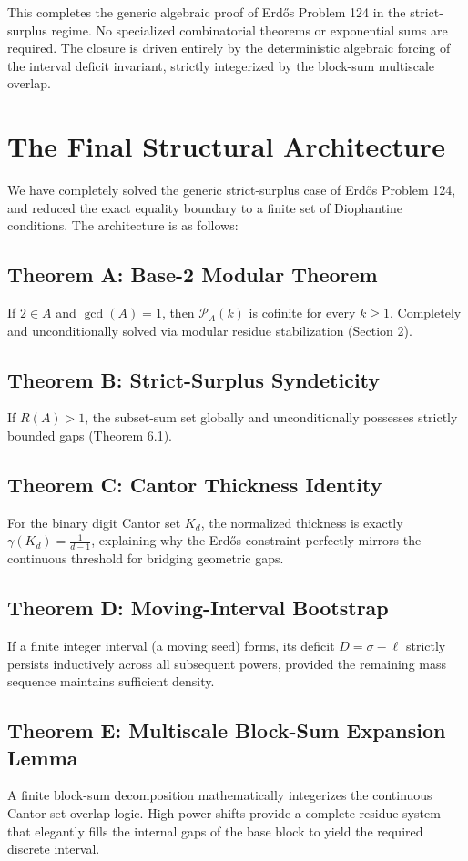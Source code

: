 \documentclass[12pt,reqno]{amsart}
\theoremstyle{definition}
\begin{document}
This completes the generic algebraic proof of Erd\H{o}s Problem 124 in the strict-surplus regime. No specialized combinatorial theorems or exponential sums are required. The closure is driven entirely by the deterministic algebraic forcing of the interval deficit invariant, strictly integerized by the block-sum multiscale overlap.

\section{The Final Structural Architecture}

We have completely solved the generic strict-surplus case of Erd\H{o}s Problem 124, and reduced the exact equality boundary to a finite set of Diophantine conditions. The architecture is as follows:

\subsection{Theorem A: Base-2 Modular Theorem}
If $2 \in A$ and $\gcd(A)=1$, then $\mathcal{P}_A(k)$ is cofinite for every $k \ge 1$. Completely and unconditionally solved via modular residue stabilization (Section 2).

\subsection{Theorem B: Strict-Surplus Syndeticity}
If $R(A) > 1$, the subset-sum set globally and unconditionally possesses strictly bounded gaps (Theorem 6.1).

\subsection{Theorem C: Cantor Thickness Identity}
For the binary digit Cantor set $K_d$, the normalized thickness is exactly $\gamma(K_d) = \frac{1}{d-1}$, explaining why the Erd\H{o}s constraint perfectly mirrors the continuous threshold for bridging geometric gaps.

\subsection{Theorem D: Moving-Interval Bootstrap}
If a finite integer interval (a moving seed) forms, its deficit $D = \sigma - \ell$ strictly persists inductively across all subsequent powers, provided the remaining mass sequence maintains sufficient density.

\subsection{Theorem E: Multiscale Block-Sum Expansion Lemma}
A finite block-sum decomposition mathematically integerizes the continuous Cantor-set overlap logic. High-power shifts provide a complete residue system that elegantly fills the internal gaps of the base block to yield the required discrete interval.
\end{document}
